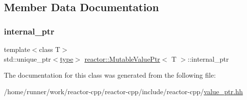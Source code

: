 \subsection{Member Data Documentation}
\mbox{\label{classreactor_1_1MutableValuePtr_aa141f1a246bb58b3047eb0d6ac54e2e9}} 
\subsubsection{\texorpdfstring{internal\+\_\+ptr}{internal\_ptr}}
{\footnotesize\ttfamily template$<$class T$>$ \\
std\+::unique\+\_\+ptr$<$\hyperlink{classreactor_1_1MutableValuePtr_a6dfaa60279549db876d8ea8b1135b46a}{type}$>$ \hyperlink{classreactor_1_1MutableValuePtr}{reactor\+::\+Mutable\+Value\+Ptr}$<$ T $>$\+::internal\+\_\+ptr\hspace{0.3cm}{\ttfamily [private]}}



The documentation for this class was generated from the following file\+:\begin{DoxyCompactItemize}
\item 
/home/runner/work/reactor-\/cpp/reactor-\/cpp/include/reactor-\/cpp/\hyperlink{value__ptr_8hh}{value\+\_\+ptr.\+hh}\end{DoxyCompactItemize}
